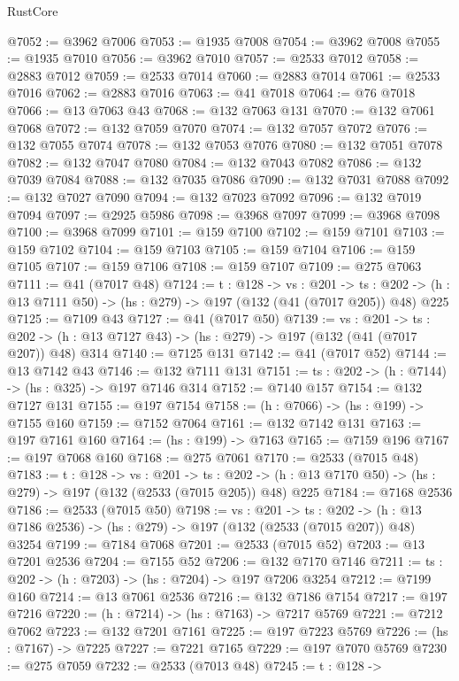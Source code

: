 \begin{lexlean}{RustCore}
\begin{coremodule}
@7052 := @3962 @7006
@7053 := @1935 @7008
@7054 := @3962 @7008
@7055 := @1935 @7010
@7056 := @3962 @7010
@7057 := @2533 @7012
@7058 := @2883 @7012
@7059 := @2533 @7014
@7060 := @2883 @7014
@7061 := @2533 @7016
@7062 := @2883 @7016
@7063 := @41 @7018
@7064 := @76 @7018
@7066 := @13 @7063 @43
@7068 := @132 @7063 @131
@7070 := @132 @7061 @7068
@7072 := @132 @7059 @7070
@7074 := @132 @7057 @7072
@7076 := @132 @7055 @7074
@7078 := @132 @7053 @7076
@7080 := @132 @7051 @7078
@7082 := @132 @7047 @7080
@7084 := @132 @7043 @7082
@7086 := @132 @7039 @7084
@7088 := @132 @7035 @7086
@7090 := @132 @7031 @7088
@7092 := @132 @7027 @7090
@7094 := @132 @7023 @7092
@7096 := @132 @7019 @7094
@7097 := @2925 @5986
@7098 := @3968 @7097
@7099 := @3968 @7098
@7100 := @3968 @7099
@7101 := @159 @7100
@7102 := @159 @7101
@7103 := @159 @7102
@7104 := @159 @7103
@7105 := @159 @7104
@7106 := @159 @7105
@7107 := @159 @7106
@7108 := @159 @7107
@7109 := @275 @7063
@7111 := @41 (@7017 @48)
@7124 := {t : @128} ->
  {vs : @201} ->
  {ts : @202} -> (h : @13 @7111 @50) -> (hs : @279) -> @197 (@132 (@41 (@7017 @205)) @48) @225
@7125 := @7109 @43
@7127 := @41 (@7017 @50)
@7139 := {vs : @201} ->
  {ts : @202} -> (h : @13 @7127 @43) -> (hs : @279) -> @197 (@132 (@41 (@7017 @207)) @48) @314
@7140 := @7125 @131
@7142 := @41 (@7017 @52)
@7144 := @13 @7142 @43
@7146 := @132 @7111 @131
@7151 := {ts : @202} -> (h : @7144) -> (hs : @325) -> @197 @7146 @314
@7152 := @7140 @157
@7154 := @132 @7127 @131
@7155 := @197 @7154
@7158 := (h : @7066) -> (hs : @199) -> @7155 @160
@7159 := @7152 @7064
@7161 := @132 @7142 @131
@7163 := @197 @7161 @160
@7164 := (hs : @199) -> @7163
@7165 := @7159 @196
@7167 := @197 @7068 @160
@7168 := @275 @7061
@7170 := @2533 (@7015 @48)
@7183 := {t : @128} ->
  {vs : @201} ->
  {ts : @202} -> (h : @13 @7170 @50) -> (hs : @279) -> @197 (@132 (@2533 (@7015 @205)) @48) @225
@7184 := @7168 @2536
@7186 := @2533 (@7015 @50)
@7198 := {vs : @201} ->
  {ts : @202} -> (h : @13 @7186 @2536) -> (hs : @279) -> @197 (@132 (@2533 (@7015 @207)) @48) @3254
@7199 := @7184 @7068
@7201 := @2533 (@7015 @52)
@7203 := @13 @7201 @2536
@7204 := @7155 @52
@7206 := @132 @7170 @7146
@7211 := {ts : @202} -> (h : @7203) -> (hs : @7204) -> @197 @7206 @3254
@7212 := @7199 @160
@7214 := @13 @7061 @2536
@7216 := @132 @7186 @7154
@7217 := @197 @7216
@7220 := (h : @7214) -> (hs : @7163) -> @7217 @5769
@7221 := @7212 @7062
@7223 := @132 @7201 @7161
@7225 := @197 @7223 @5769
@7226 := (hs : @7167) -> @7225
@7227 := @7221 @7165
@7229 := @197 @7070 @5769
@7230 := @275 @7059
@7232 := @2533 (@7013 @48)
@7245 := {t : @128} ->

\end{coremodule}
\end{lexlean}
